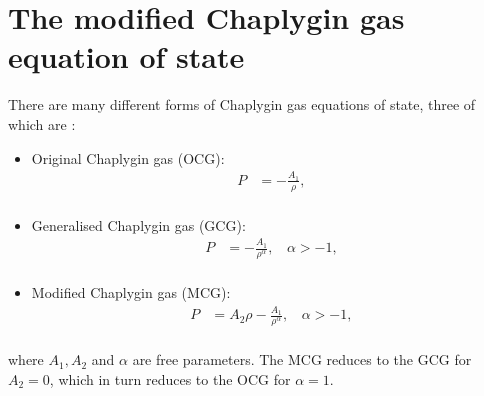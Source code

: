 \documentclass[a4paper, 11pt]{FSKH_623_Report}
\renewcommand{\baselinestretch}{0.8}
\numberwithin{equation}{section}
\begin{document}
\section{The modified Chaplygin gas equation of state}
\renewcommand{\baselinestretch}{0.5}
There are many different forms of Chaplygin gas equations of state, three of which are \citep{kahya2015universe}:
\begin{itemize}
\item Original Chaplygin gas (OCG):
\begin{equation}\label{eq:OCG}
\begin{split}
P &= -\frac{A_{1}}{\rho},         \\
\end{split}
\end{equation}
\item Generalised Chaplygin gas (GCG):
\begin{equation}\label{eq:GCG}
\begin{split}
P &= -\frac{A_{1}}{\rho^{\alpha}},\ \ \ \ \alpha>-1,         \\
\end{split}
\end{equation}
\item Modified Chaplygin gas (MCG):
\begin{equation}\label{eq:MCG}
\begin{split}
P &=A_{2}\rho -\frac{A_{1}}{\rho^{\alpha}},\ \ \ \ \alpha>-1,         \\
\end{split}
\end{equation}
\end{itemize}
\renewcommand{\baselinestretch}{1.3}
where $A_{1},A_{2}$ and $\alpha$ are free parameters. The MCG reduces to the GCG for $A_{2}=0$, which in turn reduces to the OCG for $\alpha=1$.
\end{document}
